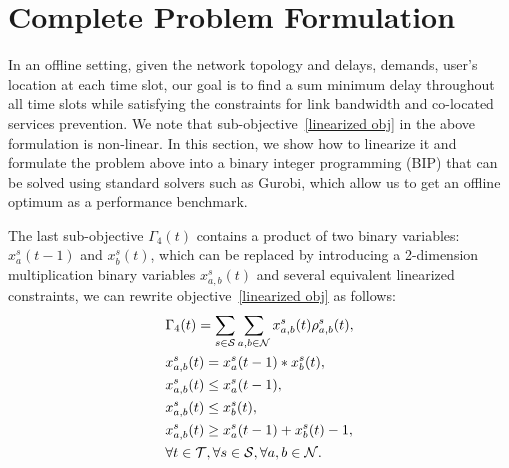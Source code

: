 

\section{Complete Problem Formulation}
\label{section: complete problem formulation}
In an offline setting, given the network topology and delays, demands, user's location at each time slot, our goal is to find a sum minimum delay throughout all time slots while satisfying the constraints for link bandwidth and co-located services prevention. 
We note that sub-objective~\ref{linearized obj} in the above formulation is non-linear. In this section, we show how to linearize it and formulate the problem above into a binary integer programming (BIP) that can be solved using standard solvers such as Gurobi\cite{gurobi}, which allow us to get an offline optimum as a performance benchmark.

The last sub-objective $\Gamma_4(t)$ contains a product of two binary variables: $x^s_a(t-1)$ and $x^s_b(t)$, which can be replaced by introducing a 2-dimension multiplication binary variables $x^s_{a,b}(t)$ and several equivalent linearized constraints, we can rewrite objective~\ref{linearized obj}  as follows:
\begin{equation}
	\label{eqn:objlinearization}
	\begin{aligned}
		&\Gamma_{4}(t) = \sum_{s\in\mathcal{S}}
		\sum_{a,b\in\mathcal{N}}
		x^s_{a,b}(t)\rho_{a,b}^{s}(t),\\
		&x^s_{a,b}(t) = x^s_a(t-1) * x^s_b(t),\\
		& x^s_{a,b}(t) \leq x^s_a(t-1), \\
		&x^s_{a,b}(t) \leq x^s_b(t),\\
		& x^s_{a,b}(t)  \geq  x^s_a(t-1) + x^s_b(t) -1,\\
		& \forall t\in \mathcal{T}, \forall s \in \mathcal{S}, \forall a,b \in \mathcal{N}.\\
	\end{aligned}
\end{equation}

